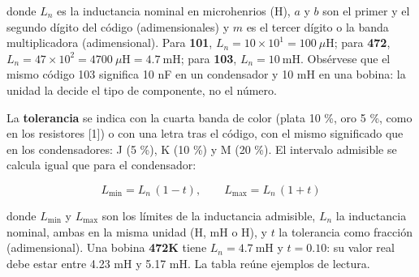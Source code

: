 \documentclass[11pt,letterpaper]{article}
\begin{document}
donde $L_n$ es la inductancia nominal en microhenrios (\textmu{}H), $a$ y $b$ son el primer y el segundo dígito del código (adimensionales) y $m$ es el tercer dígito o la banda multiplicadora (adimensional). Para \textbf{101}, $L_n = 10 \times 10^1 = 100\ \mu\text{H}$; para \textbf{472}, $L_n = 47 \times 10^2 = 4700\ \mu\text{H} = 4.7\ \text{mH}$; para \textbf{103}, $L_n = 10\ \text{mH}$. Obsérvese que el mismo código 103 significa 10 nF en un condensador y 10 mH en una bobina: la unidad la decide el tipo de componente, no el número.

La \textbf{tolerancia} se indica con la cuarta banda de color (plata \textpm{}10 \%, oro \textpm{}5 \%, como en los resistores [1]) o con una letra tras el código, con el mismo significado que en los condensadores: J (\textpm{}5 \%), K (\textpm{}10 \%) y M (\textpm{}20 \%). El intervalo admisible se calcula igual que para el condensador:

\begin{equation}
  L_{\min} = L_{n}\,(1 - t), \qquad L_{\max} = L_{n}\,(1 + t)
\end{equation}

donde $L_{\min}$ y $L_{\max}$ son los límites de la inductancia admisible, $L_n$ la inductancia nominal, ambas en la misma unidad (\textmu{}H, mH o H), y $t$ la tolerancia como fracción (adimensional). Una bobina \textbf{472K} tiene $L_n = 4.7\ \text{mH}$ y $t = 0.10$: su valor real debe estar entre 4.23 mH y 5.17 mH. La tabla reúne ejemplos de lectura.
\end{document}
